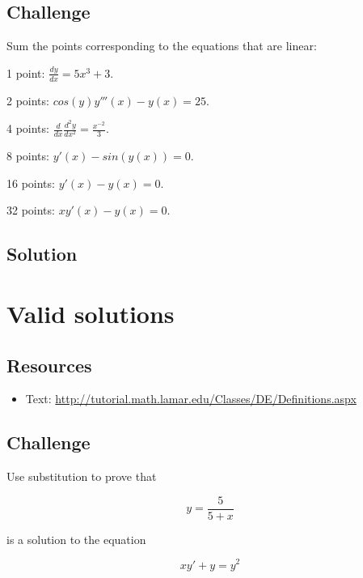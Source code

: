 \subsection*{Challenge}
Sum the points corresponding to the equations that are linear:

1 point: $\frac{dy}{dx} = 5x^3 + 3$.

2 points: $cos(y) y'''(x) - y(x) = 25$.

4 points: $\frac{d}{dx} \frac{d^2 y}{dx^2} = \frac{x^{-2}}{3}$.

8 points: $y'(x) - sin(y(x)) = 0$.

16 points: $y'(x) - y(x) = 0$.

32 points: $x y'(x) - y(x) = 0$.

\subsection*{Solution}
\six{}


\timebox


\newpage

\section{Valid solutions}

\subsection*{Resources}
\begin{itemize}
    \item Text: \url{http://tutorial.math.lamar.edu/Classes/DE/Definitions.aspx}
\end{itemize}

\subsection*{Challenge}

Use substitution to prove that

\begin{equation}
    y=\frac{5}{5+x}
\end{equation}

is a solution to the equation

\begin{equation}
    x y'+y=y^2
\end{equation}

